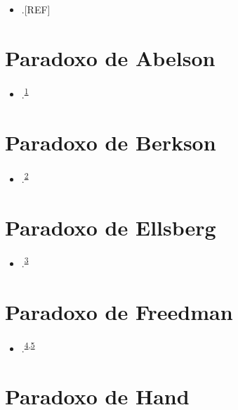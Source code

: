 \documentclass[
]{book}
\providecommand{\tightlist}{%
  \setlength{\itemsep}{0pt}\setlength{\parskip}{0pt}}
\begin{document}
\begin{itemize}
\tightlist
\item
  .{[}REF{]}
\end{itemize}

\hypertarget{abelson}{%
\section{Paradoxo de Abelson}\label{abelson}}

\begin{itemize}
\tightlist
\item
  .\textsuperscript{\protect\hyperlink{ref-abelson1985}{1}}
\end{itemize}

\hypertarget{Berkson}{%
\section{Paradoxo de Berkson}\label{Berkson}}

\begin{itemize}
\tightlist
\item
  .\textsuperscript{\protect\hyperlink{ref-berkson1946}{2}}
\end{itemize}

\hypertarget{ellsberg}{%
\section{Paradoxo de Ellsberg}\label{ellsberg}}

\begin{itemize}
\tightlist
\item
  .\textsuperscript{\protect\hyperlink{ref-ellsberg1961}{3}}
\end{itemize}

\hypertarget{freedman}{%
\section{Paradoxo de Freedman}\label{freedman}}

\begin{itemize}
\tightlist
\item
  .\textsuperscript{\protect\hyperlink{ref-freedman1983}{4},\protect\hyperlink{ref-freedman1989}{5}}
\end{itemize}

\hypertarget{hand}{%
\section{Paradoxo de Hand}\label{hand}}
\end{document}
